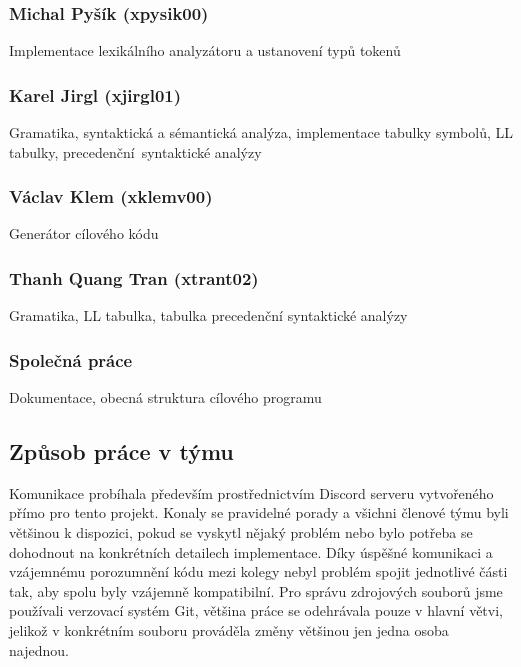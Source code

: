 \documentclass[a4paper, 12pt]{article}
\begin{document}
\subsubsection*{Michal Pyšík (xpysik00)}
Implementace lexikálního analyzátoru a ustanovení typů tokenů

\subsubsection*{Karel Jirgl (xjirgl01)}
Gramatika, syntaktická a sémantická analýza, implementace tabulky symbolů, LL tabulky, precedenční~syntaktické analýzy

\subsubsection*{Václav Klem (xklemv00) }
Generátor cílového kódu

\subsubsection*{Thanh Quang Tran (xtrant02)}
Gramatika, LL tabulka, tabulka precedenční syntaktické analýzy 

\subsubsection*{Společná práce}
Dokumentace, obecná struktura cílového programu

\subsection{Způsob práce v týmu}
Komunikace probíhala především prostřednictvím Discord serveru vytvořeného přímo pro tento projekt. Konaly se pravidelné porady a všichni členové týmu byli většinou k dispozici, pokud se vyskytl nějaký problém nebo bylo potřeba se dohodnout na konkrétních detailech implementace. Díky úspěšné komunikaci a vzájemnému porozumnění kódu mezi kolegy nebyl problém spojit jednotlivé části tak, aby spolu byly vzájemně kompatibilní. Pro správu zdrojových souborů jsme používali verzovací systém Git, většina práce se odehrávala pouze v hlavní větvi, jelikož v konkrétním souboru prováděla změny většinou jen jedna osoba najednou.

\newpage
\end{document}
